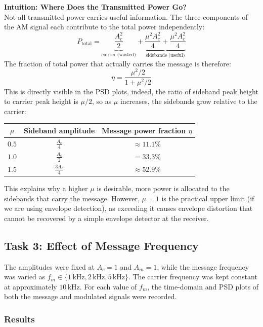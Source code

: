 \documentclass[12pt]{article}
\begin{document}
\begin{mdframed}[linewidth=1pt]
\textbf{Intuition: Where Does the Transmitted Power Go?}\\[6pt]
Not all transmitted power carries useful information. The three components of the AM 
signal each contribute to the total power independently:
\[
P_{\text{total}} = \underbrace{\frac{A_c^2}{2}}_{\text{carrier (wasted)}} + \underbrace{\frac{\mu^2 A_c^2}{4} + \frac{\mu^2 A_c^2}{4}}_{\text{sidebands (useful)}}
\]
The fraction of total power that actually carries the message is therefore:
\[
\eta = \frac{\mu^2/2}{1 + \mu^2/2}
\]
This is directly visible in the PSD plots, indeed, the ratio of sideband peak height to 
carrier peak height is $\mu/2$, so as $\mu$ increases, the sidebands grow relative 
to the carrier:
\begin{center}
\begin{tabular}{ccc}
\hline
$\mu$ & Sideband amplitude & Message power fraction $\eta$ \\
\hline
$0.5$ & $\frac{A_c}{4}$ & $\approx 11.1\%$ \\
$1.0$ & $\frac{A_c}{2}$ & $= 33.3\%$ \\
$1.5$ & $\frac{3A_c}{4}$ & $\approx 52.9\%$ \\
\hline
\end{tabular}
\end{center}
This explains why a higher $\mu$ is desirable, more power is allocated to the 
sidebands that carry the message. However, $\mu = 1$ is the practical upper limit (if we are using envelope detection), 
as exceeding it causes envelope distortion that cannot be recovered by a simple 
envelope detector at the receiver.
\end{mdframed}




\subsection{Task 3: Effect of Message Frequency}

The amplitudes were fixed at $A_c=1$ and $A_m=1$, while the message frequency was varied as $f_m \in \{1\,\text{kHz}, 2\,\text{kHz}, 5\,\text{kHz}\}$. The carrier frequency was kept constant at approximately $10\,\text{kHz}$. For each value of $f_m$, the time-domain and PSD plots of both the message and modulated signals were recorded.

\subsubsection*{Results}
\end{document}
